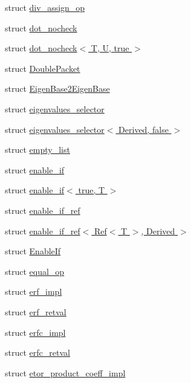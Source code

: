 \begin{DoxyCompactItemize}
\item 
struct \hyperlink{struct_eigen_1_1internal_1_1div__assign__op}{div\+\_\+assign\+\_\+op}
\item 
struct \hyperlink{struct_eigen_1_1internal_1_1dot__nocheck}{dot\+\_\+nocheck}
\item 
struct \hyperlink{struct_eigen_1_1internal_1_1dot__nocheck_3_01_t_00_01_u_00_01true_01_4}{dot\+\_\+nocheck$<$ T, U, true $>$}
\item 
struct \hyperlink{struct_eigen_1_1internal_1_1_double_packet}{Double\+Packet}
\item 
struct \hyperlink{struct_eigen_1_1internal_1_1_eigen_base2_eigen_base}{Eigen\+Base2\+Eigen\+Base}
\item 
struct \hyperlink{struct_eigen_1_1internal_1_1eigenvalues__selector}{eigenvalues\+\_\+selector}
\item 
struct \hyperlink{struct_eigen_1_1internal_1_1eigenvalues__selector_3_01_derived_00_01false_01_4}{eigenvalues\+\_\+selector$<$ Derived, false $>$}
\item 
struct \hyperlink{struct_eigen_1_1internal_1_1empty__list}{empty\+\_\+list}
\item 
struct \hyperlink{struct_eigen_1_1internal_1_1enable__if}{enable\+\_\+if}
\item 
struct \hyperlink{struct_eigen_1_1internal_1_1enable__if_3_01true_00_01_t_01_4}{enable\+\_\+if$<$ true, T $>$}
\item 
struct \hyperlink{struct_eigen_1_1internal_1_1enable__if__ref}{enable\+\_\+if\+\_\+ref}
\item 
struct \hyperlink{struct_eigen_1_1internal_1_1enable__if__ref_3_01_ref_3_01_t_01_4_00_01_derived_01_4}{enable\+\_\+if\+\_\+ref$<$ Ref$<$ T $>$, Derived $>$}
\item 
struct \hyperlink{struct_eigen_1_1internal_1_1_enable_if}{Enable\+If}
\item 
struct \hyperlink{struct_eigen_1_1internal_1_1equal__op}{equal\+\_\+op}
\item 
struct \hyperlink{struct_eigen_1_1internal_1_1erf__impl}{erf\+\_\+impl}
\item 
struct \hyperlink{struct_eigen_1_1internal_1_1erf__retval}{erf\+\_\+retval}
\item 
struct \hyperlink{struct_eigen_1_1internal_1_1erfc__impl}{erfc\+\_\+impl}
\item 
struct \hyperlink{struct_eigen_1_1internal_1_1erfc__retval}{erfc\+\_\+retval}
\item 
struct \hyperlink{struct_eigen_1_1internal_1_1etor__product__coeff__impl}{etor\+\_\+product\+\_\+coeff\+\_\+impl}

\end{DoxyCompactItemize}
